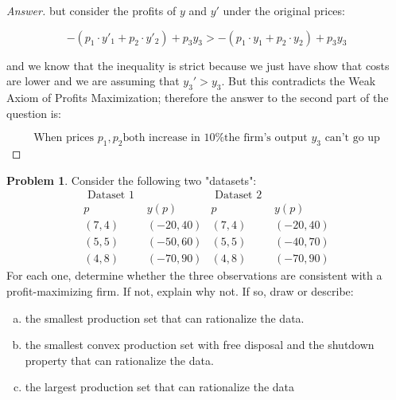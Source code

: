 \documentclass{article}
\theoremstyle{definition}
\newtheorem{problem}{Problem}
\begin{document}
\begin{proof}[Answer]
but consider the profits of $y$ and $y'$ under the original prices:

$$-(p_1\cdot y'_1 + p_2\cdot y'_2) + p_3 y_3 > -(p_1\cdot y_1+ p_2\cdot y_2) + p_3 y_3$$

and we know that the inequality is strict because we just have show that costs are lower and we are assuming that $y_3'>y_3$. But this contradicts the Weak Axiom of Profits Maximization; therefore the answer to the second part of the question is:

$$\boxed{\text{When prices } p_1, p_2 \text{both increase in 10\%  the firm's output } y_{3}\text{ can't go up}}$$

\end{proof}

\begin{problem}
Consider the following two "datasets":
$$
\begin{array}{cc|cc}
{\text { Dataset 1 }}  & &  {\text { Dataset 2 }} & \\
p & y(p) & p & y(p) \\
\hline(7,4) & (-20,40) & (7,4) & (-20,40) \\
(5,5) & (-50,60) & (5,5) & (-40,70) \\
(4,8) & (-70,90) & (4,8) & (-70,90)
\end{array}
$$
For each one, determine whether the three observations are consistent with a profit-maximizing firm. If not, explain why not. If so, draw or describe:

\begin{enumerate}[(a)]
    \item the smallest production set that can rationalize the data.
    \item the smallest convex production set with free disposal and the shutdown property that can rationalize the data.
    \item the largest production set that can rationalize the data
\end{enumerate}

\end{problem}
\end{document}
